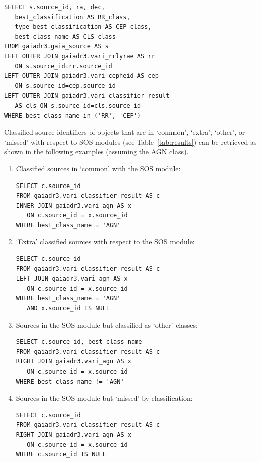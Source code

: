 \documentclass[longauth]{aa}
\begin{document}
\begin{appendix}
\begin{verbatim}
SELECT s.source_id, ra, dec,
   best_classification AS RR_class, 
   type_best_classification AS CEP_class, 
   best_class_name AS CLS_class
FROM gaiadr3.gaia_source AS s
LEFT OUTER JOIN gaiadr3.vari_rrlyrae AS rr 
   ON s.source_id=rr.source_id
LEFT OUTER JOIN gaiadr3.vari_cepheid AS cep 
   ON s.source_id=cep.source_id
LEFT OUTER JOIN gaiadr3.vari_classifier_result 
   AS cls ON s.source_id=cls.source_id
WHERE best_class_name in ('RR', 'CEP')
\end{verbatim}

Classified source identifiers of objects that are in `common', `extra', `other', or `missed' with respect to SOS modules (see Table~\ref{tab:results}) can be retrieved as shown in the following examples (assuming the AGN class). 
\begin{enumerate}
\item Classified sources in `common' with the SOS module:
\begin{verbatim}
SELECT c.source_id
FROM gaiadr3.vari_classifier_result AS c 
INNER JOIN gaiadr3.vari_agn AS x 
   ON c.source_id = x.source_id
WHERE best_class_name = 'AGN'
\end{verbatim}
\item `Extra' classified sources with respect to the SOS module:
\begin{verbatim}
SELECT c.source_id
FROM gaiadr3.vari_classifier_result AS c 
LEFT JOIN gaiadr3.vari_agn AS x 
   ON c.source_id = x.source_id
WHERE best_class_name = 'AGN' 
   AND x.source_id IS NULL
\end{verbatim}
\item Sources in the SOS module but classified as `other' classes:
\begin{verbatim}
SELECT c.source_id, best_class_name
FROM gaiadr3.vari_classifier_result AS c 
RIGHT JOIN gaiadr3.vari_agn AS x 
   ON c.source_id = x.source_id
WHERE best_class_name != 'AGN'
\end{verbatim}
\item Sources in the SOS module but `missed' by classification:
\begin{verbatim}
SELECT c.source_id 
FROM gaiadr3.vari_classifier_result AS c
RIGHT JOIN gaiadr3.vari_agn AS x 
   ON c.source_id = x.source_id
WHERE c.source_id IS NULL
\end{verbatim}
\end{enumerate}




\end{appendix}
\end{document}
